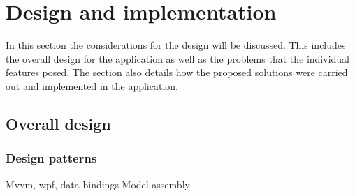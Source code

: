 \section{Design and implementation}

In this section the considerations for the
design will be discussed. This includes the overall design for the application
as well as the problems that the individual features posed. The section also
details how the proposed solutions were carried out and implemented in the
application.

\subsection{Overall design}
\subsubsection{Design patterns}

Mvvm, wpf, data bindings Model assembly

